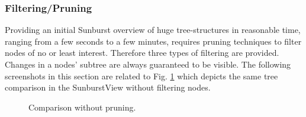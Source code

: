 \subsubsection{Filtering/Pruning}
Providing an initial Sunburst overview of huge tree-struc\-tures in reasonable time, ranging from a few seconds to a few minutes, requires pruning techniques to filter nodes of no or least interest. Therefore three types of filtering are provided. Changes in a nodes' subtree are always guaranteed to be visible. The following screenshots in this section are related to Fig. \ref{fig:without-pruning} which depicts the same tree comparison in the SunburstView without filtering nodes.

\begin{figure}[tb]
\caption{\label{fig:without-pruning} Comparison without pruning.}
\end{figure}

